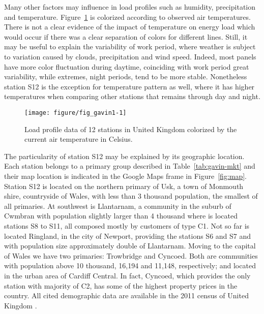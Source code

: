 
Many other factors may influence in load profiles such as humidity, precipitation and temperature. Figure~\ref{fig:gavin1} is colorized according to observed air temperatures. There is not a clear evidence of the impact of temperature on energy load which would occur if there was a clear separation of colors for different lines. Still, it may be useful to explain the variability of work period, where weather is subject to variation caused by clouds, precipitation and wind speed. Indeed, most panels have more color fluctuation during daytime, coinciding with work period great variability, while extremes, night periods, tend to be more stable. Nonetheless station S12 is the exception for temperature pattern as well, where it has higher temperatures when comparing other stations that remains through day and night.

\begin{figure}[t]
  \centering
\begin{knitrout}
\color{fgcolor}
\texttt{[image: figure/fig\_gavin1-1]} 

\end{knitrout}
  \caption{Load profile data of 12 stations in United Kingdom colorized by the current air temperature in Celsius.}
  \label{fig:gavin1}
\end{figure}



The particularity of station S12 may be explained by its geographic location. Each station belongs to a primary group described in Table~\ref{tab:gavin-mkt} and their map location is indicated in the Google Maps frame in Figure~\ref{fig:map}. Station S12 is located on the northern primary of Usk, a town of Monmouth shire, countryside of Wales, with less than 3 thousand population, the smallest of all primaries. At southwest is Llantarnam, a community in the suburb of Cwmbran with population slightly larger than 4 thousand where is located stations S8 to S11, all composed mostly by customers of type C1. Not so far is located Ringland, in the city of Newport, providing the stations S6 and S7 and with population size  approximately double of Llantarnam. Moving to the capital of Wales we have two primaries: Trowbridge and Cyncoed. Both are communities with population above 10 thousand, 16,194 and 11,148, respectively; and located in the urban area of Cardiff Central. In fact, Cyncoed, which provides the only station with majority of C2, has some of the highest property prices in the country. All cited demographic data are available in the 2011 census of United Kingdom  \cite{uk2011census}.




